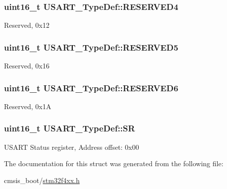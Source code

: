\subsubsection[{\texorpdfstring{R\+E\+S\+E\+R\+V\+E\+D4}{RESERVED4}}]{\setlength{\rightskip}{0pt plus 5cm}uint16\+\_\+t U\+S\+A\+R\+T\+\_\+\+Type\+Def\+::\+R\+E\+S\+E\+R\+V\+E\+D4}\hypertarget{struct_u_s_a_r_t___type_def_a6ac527c7428ad8807a7740c1f33f0351}{}\label{struct_u_s_a_r_t___type_def_a6ac527c7428ad8807a7740c1f33f0351}
Reserved, 0x12 
\subsubsection[{\texorpdfstring{R\+E\+S\+E\+R\+V\+E\+D5}{RESERVED5}}]{\setlength{\rightskip}{0pt plus 5cm}uint16\+\_\+t U\+S\+A\+R\+T\+\_\+\+Type\+Def\+::\+R\+E\+S\+E\+R\+V\+E\+D5}\hypertarget{struct_u_s_a_r_t___type_def_aa893512291681dfbecc5baa899cfafbf}{}\label{struct_u_s_a_r_t___type_def_aa893512291681dfbecc5baa899cfafbf}
Reserved, 0x16 
\subsubsection[{\texorpdfstring{R\+E\+S\+E\+R\+V\+E\+D6}{RESERVED6}}]{\setlength{\rightskip}{0pt plus 5cm}uint16\+\_\+t U\+S\+A\+R\+T\+\_\+\+Type\+Def\+::\+R\+E\+S\+E\+R\+V\+E\+D6}\hypertarget{struct_u_s_a_r_t___type_def_acd89bb1cba0381c2be8a551e6d14e9f7}{}\label{struct_u_s_a_r_t___type_def_acd89bb1cba0381c2be8a551e6d14e9f7}
Reserved, 0x1A 
\subsubsection[{\texorpdfstring{SR}{SR}}]{ uint16\+\_\+t U\+S\+A\+R\+T\+\_\+\+Type\+Def\+::\+SR}\hypertarget{struct_u_s_a_r_t___type_def_a3f1fd9f0c004d3087caeba4815faa41c}{}\label{struct_u_s_a_r_t___type_def_a3f1fd9f0c004d3087caeba4815faa41c}
U\+S\+A\+RT Status register, Address offset\+: 0x00 

The documentation for this struct was generated from the following file\+:\begin{DoxyCompactItemize}
\item 
cmsis\+\_\+boot/\hyperlink{stm32f4xx_8h}{stm32f4xx.\+h}\end{DoxyCompactItemize}
